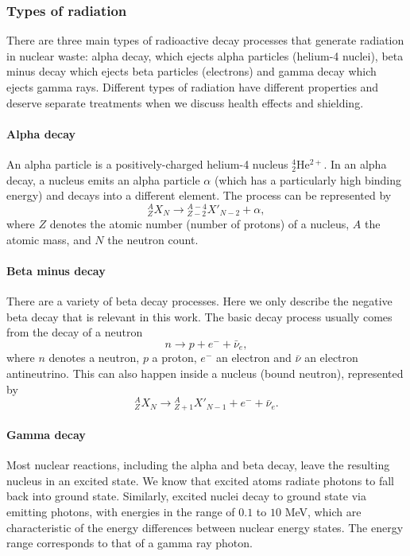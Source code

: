 \documentclass[nofootinbib,preprint,aps]{revtex4-1}
\begin{document}
        \subsubsection{Types of radiation}
        There are three main types of radioactive decay processes that generate radiation in nuclear waste: 
        alpha decay, which ejects alpha particles (helium-4 nuclei), beta minus decay which ejects beta
        particles (electrons) and gamma decay which ejects gamma rays.
        Different types of radiation 
        have different properties and deserve separate treatments when we discuss health effects and shielding.
        \paragraph{Alpha decay}
        An alpha particle is a positively-charged 
        helium-4 nucleus ${}^4_2$He$^{2+}$. In an alpha decay, a nucleus emits an alpha
        particle $\alpha$ (which has a particularly high binding energy) and decays into a different element.
        The process can be represented by
        \begin{equation}
            {}^A_Z X_N \rightarrow {}^{A-4}_{Z-2}X'_{N-2} + \alpha,
        \end{equation}
        where $Z$ denotes the atomic number (number of protons) of a nucleus, $A$ the atomic mass, and $N$ the
        neutron count.

        \paragraph{Beta minus decay}
        There are a variety of beta decay processes. Here we only describe the negative beta decay that is
        relevant in this work. The basic decay process usually comes from the decay of a neutron
        \begin{equation}
            n \rightarrow p + e^- + \bar{\nu}_e,
        \end{equation}
        where $n$ denotes a neutron, $p$ a proton, $e^-$ an electron and $\bar{\nu}$ an electron antineutrino.
        This can also happen inside a nucleus (bound neutron), represented by
        \begin{equation}
            {}^A_Z X_N \rightarrow {}^A_{Z+1} X'_{N-1} + e^- + \bar{\nu}_e.
        \end{equation}

        \paragraph{Gamma decay}
        Most nuclear reactions, including the alpha and beta decay, leave the resulting nucleus in
        an excited state.
        We know that excited atoms radiate photons to fall back into ground state. Similarly, excited nuclei
        decay to ground state via emitting photons, with energies in the range
        of $0.1$ to $10$ MeV, which are characteristic of the energy differences between nuclear energy states.
        The energy range corresponds to that of a gamma ray photon.
    
\end{document}
